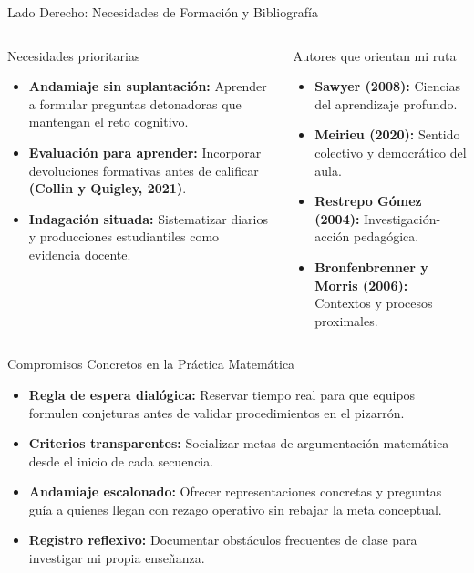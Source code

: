 \documentclass[aspectratio=169,spanish,xcolor=table]{beamer}
\begin{document}
\begin{frame}{Lado Derecho: Necesidades de Formación y Bibliografía}
  \begin{columns}[T]
      \begin{block}{Necesidades prioritarias}
        \begin{itemize}\scriptsize
          \item \textbf{Andamiaje sin suplantación:} Aprender a formular preguntas detonadoras que mantengan el reto cognitivo.
          \item \textbf{Evaluación para aprender:} Incorporar devoluciones formativas antes de calificar \textbf{(Collin y Quigley, 2021)}.
          \item \textbf{Indagación situada:} Sistematizar diarios y producciones estudiantiles como evidencia docente.
        \end{itemize}
      \end{block}
      \begin{block}{Autores que orientan mi ruta}
        \begin{itemize}\scriptsize
          \item \textbf{Sawyer (2008):} Ciencias del aprendizaje profundo.
          \item \textbf{Meirieu (2020):} Sentido colectivo y democrático del aula.
          \item \textbf{Restrepo Gómez (2004):} Investigación-acción pedagógica.
          \item \textbf{Bronfenbrenner y Morris (2006):} Contextos y procesos proximales.
        \end{itemize}
      \end{block}
  \end{columns}
\end{frame}

\begin{frame}{Compromisos Concretos en la Práctica Matemática}
  \begin{itemize}\normalsize
    \item \textbf{Regla de espera dialógica:} Reservar tiempo real para que equipos formulen conjeturas antes de validar procedimientos en el pizarrón.
    \item \textbf{Criterios transparentes:} Socializar metas de argumentación matemática desde el inicio de cada secuencia.
    \item \textbf{Andamiaje escalonado:} Ofrecer representaciones concretas y preguntas guía a quienes llegan con rezago operativo sin rebajar la meta conceptual.
    \item \textbf{Registro reflexivo:} Documentar obstáculos frecuentes de clase para investigar mi propia enseñanza.
  \end{itemize}
\end{frame}
\end{document}
